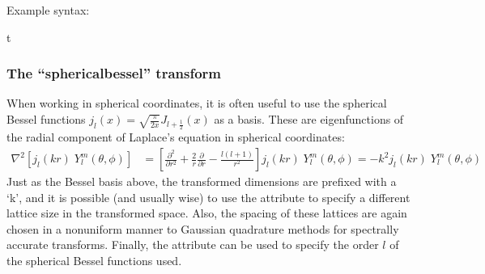 \documentclass[letterpaper,10pt,english]{sphinxmanual}
\begin{document}
\sphinxAtStartPar
Example syntax:

\begin{sphinxVerbatim}[commandchars=\\\{\}]
 
         t 
                  
\end{sphinxVerbatim}

\ignorespaces 

\subsubsection{The “spherical\sphinxhyphen{}bessel” transform}
\label{\detokenize{reference_elements:the-spherical-bessel-transform}}\label{\detokenize{reference_elements:spherical-bessel-transform}}\label{\detokenize{reference_elements:index-41}}
\sphinxAtStartPar
When working in spherical coordinates, it is often useful to use the spherical Bessel functions \(j_l(x)=\sqrt{\frac{\pi}{2x}}J_{l+\frac{1}{2}}(x)\) as a basis.  These are eigenfunctions of the radial component of Laplace’s equation in spherical coordinates:
\begin{equation*}
\begin{split}\nabla^2 \left[j_l(k r)\; Y^m_l(\theta, \phi)\right] &= \left[\frac{\partial^2 }{\partial r^2} +\frac{2}{r}\frac{\partial }{\partial r} -\frac{l(l+1)}{r^2}\right] j_l(k r) \; Y^m_l(\theta, \phi) = -k^2 j_l(k r)\; Y^m_l(\theta, \phi)\end{split}
\end{equation*}
\sphinxAtStartPar
Just as the Bessel basis above, the transformed dimensions are prefixed with a ‘k’, and it is possible (and usually wise) to use the  attribute to specify a different lattice size in the transformed space.  Also, the spacing of these lattices are again chosen in a non\sphinxhyphen{}uniform manner to Gaussian quadrature methods for spectrally accurate transforms.  Finally, the  attribute can be used to specify the order \(l\) of the spherical Bessel functions used.
\end{document}
